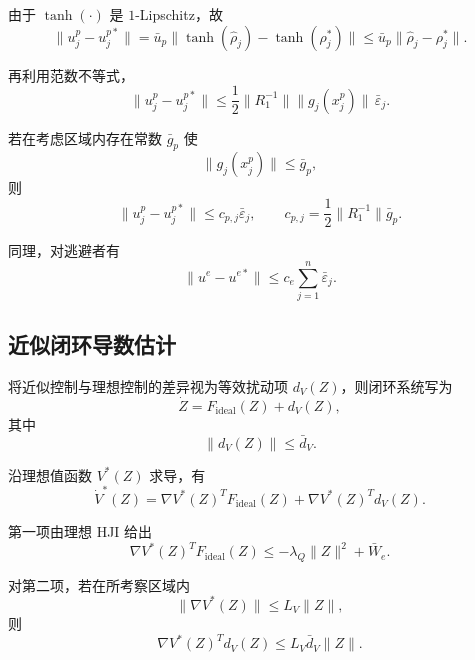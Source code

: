 \documentclass[12pt,a4paper]{ctexart}
\begin{document}
由于 $\tanh(\cdot)$ 是 $1$-Lipschitz，故
\begin{equation}
\|u_j^p-u_j^{p*}\|
=
\bar u_p\|\tanh(\hat\rho_j)-\tanh(\rho_j^*)\|
\le
\bar u_p\|\hat\rho_j-\rho_j^*\|.
\end{equation}

再利用范数不等式，
\begin{equation}
\|u_j^p-u_j^{p*}\|
\le
\frac{1}{2}\|R_1^{-1}\|\|g_j(x_j^p)\|\,\bar\varepsilon_j.
\end{equation}

若在考虑区域内存在常数 $\bar g_p$ 使
\begin{equation}
\|g_j(x_j^p)\|\le \bar g_p,
\end{equation}
则
\begin{equation}
\|u_j^p-u_j^{p*}\|
\le
c_{p,j}\bar\varepsilon_j,
\qquad
c_{p,j}=\frac{1}{2}\|R_1^{-1}\|\bar g_p.
\end{equation}

同理，对逃避者有
\begin{equation}
\|u^e-u^{e*}\|
\le
c_e\sum_{j=1}^{n}\bar\varepsilon_j.
\end{equation}

\subsection{近似闭环导数估计}

将近似控制与理想控制的差异视为等效扰动项 $d_V(Z)$，则闭环系统写为
\begin{equation}
\dot Z = F_{\mathrm{ideal}}(Z)+d_V(Z),
\end{equation}
其中
\begin{equation}
\|d_V(Z)\|\le \bar d_V.
\end{equation}

沿理想值函数 $V^*(Z)$ 求导，有
\begin{equation}
\dot V^*(Z)
=
\nabla V^*(Z)^TF_{\mathrm{ideal}}(Z)
+
\nabla V^*(Z)^Td_V(Z).
\end{equation}

第一项由理想 HJI 给出
\begin{equation}
\nabla V^*(Z)^TF_{\mathrm{ideal}}(Z)
\le
-\lambda_Q\|Z\|^2+\bar W_e.
\end{equation}

对第二项，若在所考察区域内
\begin{equation}
\|\nabla V^*(Z)\|\le L_V\|Z\|,
\end{equation}
则
\begin{equation}
\nabla V^*(Z)^Td_V(Z)
\le
L_V\bar d_V\|Z\|.
\end{equation}
\end{document}
